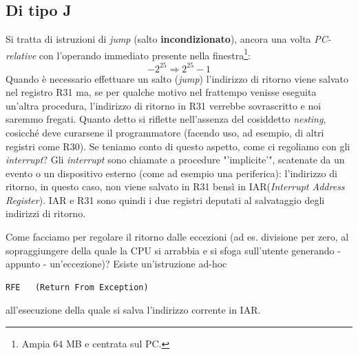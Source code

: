 \subsection{Di tipo J}
\label{sec:tipoJ}

Si tratta di istruzioni di \textit{jump} (salto \textbf{incondizionato}), ancora una volta \textit{PC-relative} con l'operando immediato presente nella finestra\footnote{Ampia 64 MB e centrata sul PC.}:
\[
-2^{25} \Rightarrow 2^{25}-1
\]
Quando è necessario effettuare un salto (\textit{jump}) l'indirizzo di ritorno viene salvato nel registro R31 ma, se per qualche motivo nel frattempo venisse eseguita un'altra procedura, l'indirizzo di ritorno in R31 verrebbe sovrascritto e noi saremmo fregati. Quanto detto si riflette nell'assenza del cosiddetto \textit{nesting}, cosicché deve curarsene il programmatore (facendo uso, ad esempio, di altri registri come R30). Se teniamo conto di questo aspetto, come ci regoliamo con gli \textit{interrupt}? Gli \textit{interrupt} sono chiamate a procedure "'implicite'", scatenate da un evento o un dispositivo esterno (come ad esempio una periferica): l'indirizzo di ritorno, in questo caso, non viene salvato in R31 bensì in IAR(\textit{Interrupt Address Register}). 
IAR e R31 sono quindi i due registri deputati al salvataggio degli indirizzi di ritorno.

Come facciamo per regolare il ritorno dalle eccezioni (ad es. divisione per zero, al sopraggiungere della quale la CPU si arrabbia e si sfoga sull'utente generando - appunto - un'eccezione)? Esiste un'istruzione ad-hoc
\begin{verbatim}
RFE   (Return From Exception)
\end{verbatim}
all'esecuzione della quale si salva l'indirizzo corrente in IAR. 
